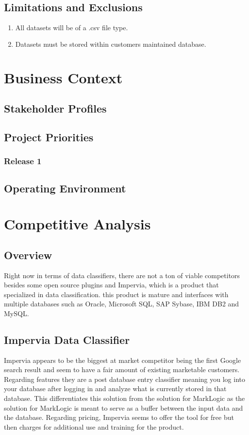 \documentclass[12pt,oneside,letterpaper]{article}
\begin{document}
\subsection{Limitations and Exclusions}
\begin{enumerate}
    \item All datasets will be of a .csv file type.
    \item Datasets must be stored within customers maintained database.
\end{enumerate}




\section{Business Context}
\subsection{Stakeholder Profiles}
\subsection{Project Priorities}
\subsubsection{Release 1}
\subsection{Operating Environment}

\section{Competitive Analysis}
\subsection{Overview}
Right now in terms of data classifiers, there are not a ton of viable competitors besides some open source plugins and Impervia, which is a product that specialized in data classification. this product is mature and interfaces with multiple databases such as Oracle, Microsoft SQL, SAP Sybase, IBM DB2 and MySQL.  \subsection{Impervia Data Classifier}
Impervia appears to be the biggest at market competitor being the first Google search result and seem to have a fair amount of existing marketable customers. Regarding features they are a post database entry classifier meaning you log into your database after logging in and analyze what is currently stored in that database. This differentiates this solution from the solution for MarkLogic as the solution for MarkLogic is meant to serve as a buffer between the input data and the database.  Regarding pricing, Impervia seems to offer the tool for free but then charges for additional use and training for the product. 
\end{document}
